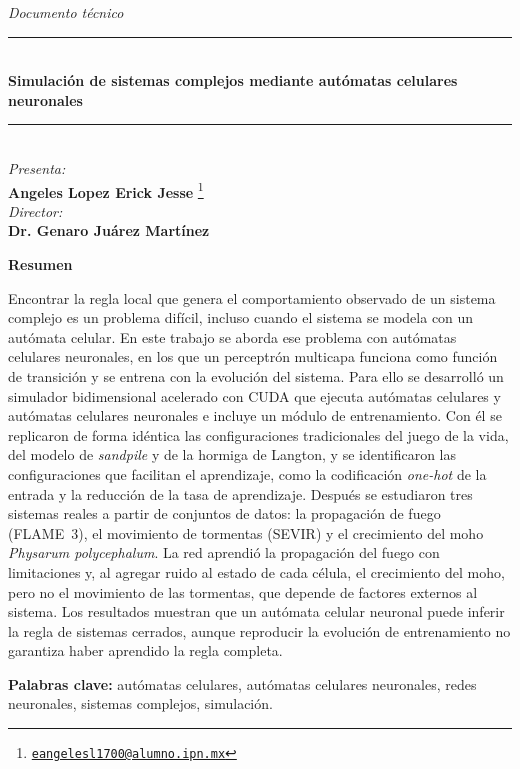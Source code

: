 \begin{center}
	
	{\fontsize{14}{17}\selectfont \textit{Documento técnico}}\\[0.2cm]
	
	\rule{0.6\textwidth}{0.4pt}\\[0.4cm]
	{\fontsize{16}{19}\selectfont \textbf{Simulación de sistemas complejos mediante autómatas celulares neuronales}}\\
	\rule{0.6\textwidth}{0.4pt}\\[0.5cm]
	
	{\fontsize{14}{17}\selectfont \textit{Presenta:}}\\[0.2cm]
	{\fontsize{14}{17}\selectfont \textbf{Angeles Lopez Erick Jesse}}%
	{\renewcommand{\thefootnote}{\fnsymbol{footnote}}%
	\footnote[1]{\href{mailto:eangelesl1700@alumno.ipn.mx}{\texttt{eangelesl1700@alumno.ipn.mx}}}}\\[0.4cm]
	
	{\fontsize{14}{17}\selectfont \textit{Director:}}\\[0.2cm]
	{\fontsize{14}{17}\selectfont \textbf{Dr. Genaro Juárez Martínez}}
	
\end{center}

{\centering \fontsize{14}{17}\selectfont \textbf{Resumen}\par}

\noindent Encontrar la regla local que genera el comportamiento observado de un sistema complejo es un problema difícil, incluso cuando el sistema se modela con un autómata celular. En este trabajo se aborda ese problema con autómatas celulares neuronales, en los que un perceptrón multicapa funciona como función de transición y se entrena con la evolución del sistema. Para ello se desarrolló un simulador bidimensional acelerado con CUDA que ejecuta autómatas celulares y autómatas celulares neuronales e incluye un módulo de entrenamiento. Con él se replicaron de forma idéntica las configuraciones tradicionales del juego de la vida, del modelo de \textit{sandpile} y de la hormiga de Langton, y se identificaron las configuraciones que facilitan el aprendizaje, como la codificación \textit{one-hot} de la entrada y la reducción de la tasa de aprendizaje. Después se estudiaron tres sistemas reales a partir de conjuntos de datos: la propagación de fuego (FLAME~3), el movimiento de tormentas (SEVIR) y el crecimiento del moho \textit{Physarum polycephalum}. La red aprendió la propagación del fuego con limitaciones y, al agregar ruido al estado de cada célula, el crecimiento del moho, pero no el movimiento de las tormentas, que depende de factores externos al sistema. Los resultados muestran que un autómata celular neuronal puede inferir la regla de sistemas cerrados, aunque reproducir la evolución de entrenamiento no garantiza haber aprendido la regla completa.

\noindent\textbf{Palabras clave:} autómatas celulares, autómatas celulares neuronales, redes neuronales, sistemas complejos, simulación.

\restoregeometry
